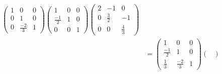 ﻿\documentclass{book} \usepackage{exsheets} \usepackage{xeCJK}
\begin{document}
\begin{solution}
\begin{align*}
\begin{pmatrix}
                                                            1&0&0\\
                                                            0&1&0\\
                                                            0&\frac{-2}{3}&1
                                                          \end{pmatrix}
                                                                            \begin{pmatrix}
                                                                              1&0&0\\
                                                                              \frac{-1}{2}&1&0\\
                                                                              0&0&1
                                                                            \end{pmatrix}
                                                                                   \begin{pmatrix}
                                                                                     2&-1&0\\
                                                                                     0&\frac{3}{2}&-1\\
                                                                                     0&0&\frac{4}{3}
                                                                                   \end{pmatrix}\\&=
                                                                                                    \begin{pmatrix}
                                                                                                      1&0&0\\
                                                                                                      \frac{-1}{2}&1&0\\
                                                                                                      \frac{1}{3}&\frac{-2}{3}&1
                                                                                                    \end{pmatrix}
                                                                                                                                \begin{pmatrix}

\end{pmatrix}
\end{align*}
\end{solution}
\end{document}
